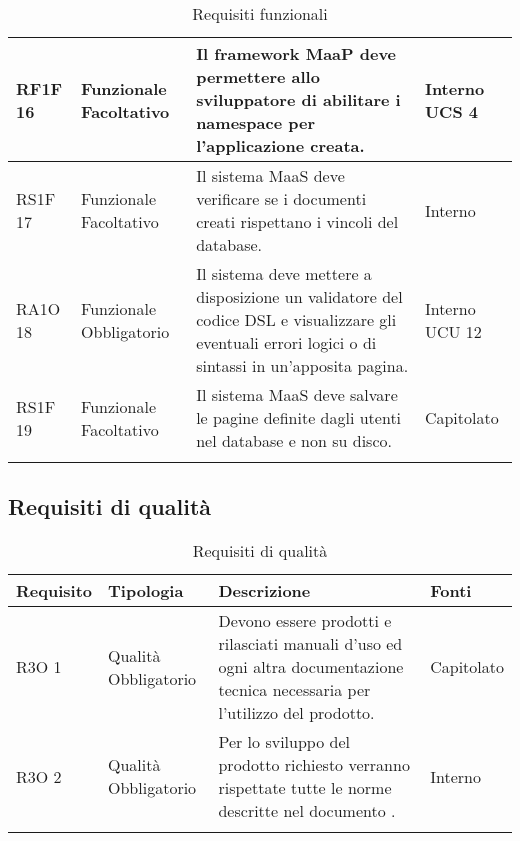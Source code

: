 \begin{center}
\begin{longtable}{ | l | p{2cm} | p{5cm} | p{1.7cm} |}
        RF1F 16 & Funzionale \newline  Facoltativo  & Il framework MaaP deve permettere allo sviluppatore di abilitare i namespace per l’applicazione creata. &  Interno \newline  UCS 4 \newline  \\ \hline      
        RS1F 17 & Funzionale \newline  Facoltativo  & Il sistema MaaS deve verificare se i documenti creati rispettano i vincoli del database. &  Interno \newline  \\ \hline      
        RA1O 18 & Funzionale \newline  Obbligatorio  & Il sistema deve mettere a disposizione un validatore del codice DSL e visualizzare gli eventuali errori logici o di sintassi in un'apposita pagina. &  Interno \newline  UCU 12 \newline  \\ \hline      
        RS1F 19 & Funzionale \newline  Facoltativo  & Il sistema MaaS deve salvare le pagine definite dagli utenti nel database e non su disco. &  Capitolato \newline  \\ \hline
      \caption{Requisiti funzionali}
      \end{longtable}
      \egroup
      \end{center}  
\clearpage

\subsection{Requisiti di qualità }

      \begin{center}
      \bgroup
      \def\arraystretch{1.8}
      \begin{longtable}{ | l | p{2cm} | p{5cm} | p{1.7cm} |}
    
      \cellcolor[gray]{0.9} \textbf{Requisito} & \cellcolor[gray]{0.9} \textbf{Tipologia} 
      & \cellcolor[gray]{0.9} \textbf{Descrizione} & \cellcolor[gray]{0.9} \textbf{Fonti} \\ \hline
      
        R3O 1 & Qualità \newline  Obbligatorio  & Devono essere prodotti e rilasciati manuali d'uso ed ogni altra documentazione tecnica necessaria per l’utilizzo del prodotto. &  Capitolato \newline  \\ \hline      
        R3O 2 & Qualità \newline  Obbligatorio  & Per lo sviluppo del prodotto richiesto verranno rispettate tutte le norme descritte nel documento \NormeDiProgetto{}. &  Interno \newline  \\ \hline
      \caption{Requisiti di qualità}
      \end{longtable}
      \egroup
      \end{center}  
\clearpage

